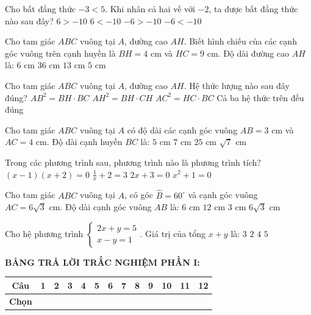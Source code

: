 \documentclass[12pt,a4paper]{article}
\begin{document}
\begin{ex}
Cho bất đẳng thức $-3 < 5$. Khi nhân cả hai vế với $-2$, ta được bất đẳng thức nào sau đây?
\choice
{\True $6 > -10$}
{$6 < -10$}
{$-6 > -10$}
{$-6 < -10$}
\end{ex}

\begin{ex}
Cho tam giác $ABC$ vuông tại $A$, đường cao $AH$. Biết hình chiếu của các cạnh góc vuông trên cạnh huyền là $BH = 4\text{ cm}$ và $HC = 9\text{ cm}$. Độ dài đường cao $AH$ là:
\choice
{\True $6\text{ cm}$}
{$36\text{ cm}$}
{$13\text{ cm}$}
{$5\text{ cm}$}
\end{ex}

\begin{ex}
Cho tam giác $ABC$ vuông tại $A$, đường cao $AH$. Hệ thức lượng nào sau đây đúng?
\choice
{$AB^2 = BH \cdot BC$}
{$AH^2 = BH \cdot CH$}
{$AC^2 = HC \cdot BC$}
{\True Cả ba hệ thức trên đều đúng}
\end{ex}

\begin{ex}
Cho tam giác $ABC$ vuông tại $A$ có độ dài các cạnh góc vuông $AB = 3\text{ cm}$ và $AC = 4\text{ cm}$. Độ dài cạnh huyền $BC$ là:
\choice
{\True $5\text{ cm}$}
{$7\text{ cm}$}
{$25\text{ cm}$}
{$\sqrt{7}\text{ cm}$}
\end{ex}

\begin{ex}
Trong các phương trình sau, phương trình nào là phương trình tích?
\choice
{\True $(x - 1)(x + 2) = 0$}
{$\frac{1}{x} + 2 = 3$}
{$2x + 3 = 0$}
{$x^2 + 1 = 0$}
\end{ex}

\begin{ex}
Cho tam giác $ABC$ vuông tại $A$, có góc $\widehat{B} = 60^\circ$ và cạnh góc vuông $AC = 6\sqrt{3}\text{ cm}$. Độ dài cạnh góc vuông $AB$ là:
\choice
{\True $6\text{ cm}$}
{$12\text{ cm}$}
{$3\text{ cm}$}
{$6\sqrt{3}\text{ cm}$}
\end{ex}

\begin{ex}
Cho hệ phương trình $\begin{cases} 2x + y = 5 \\ x - y = 1 \end{cases}$. Giá trị của tổng $x + y$ là:
\choice
{\True $3$}
{$2$}
{$4$}
{$5$}
\end{ex}


\vspace{1mm}
\noindent\textbf{BẢNG TRẢ LỜI TRẮC NGHIỆM PHẦN I:}
\begin{center}
\begin{tabular}{|c|c|c|c|c|c|c|c|c|c|c|c|c|}
\hline
\textbf{Câu} & \textbf{1} & \textbf{2} & \textbf{3} & \textbf{4} & \textbf{5} & \textbf{6} & \textbf{7} & \textbf{8} & \textbf{9} & \textbf{10} & \textbf{11} & \textbf{12} \\
\hline
\textbf{Chọn} & \rule{0pt}{0.65cm} & & & & & & & & & & & \\
\hline
\end{tabular}
\end{center}
\vspace{2mm}
\end{document}

